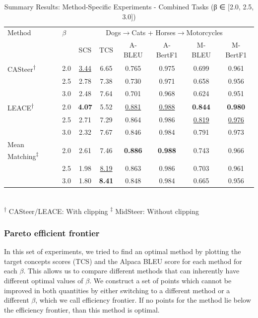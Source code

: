 \begin{table}[htbp]
\centering
\caption{Summary Results: Method-Specific Experiments - Combined Tasks (β ∈ [2.0, 2.5, 3.0])}
\label{tab:single_experiment_table_method_specific_summary}
\begin{tabular}{l|l|cccccc|}
\hline
Method & $\beta$ & \multicolumn{6}{c|}{Dogs$\rightarrow$Cats + Horses$\rightarrow$Motorcycles} \\
 &  & SCS & TCS & A-BLEU & A-BertF1 & M-BLEU & M-BertF1 \\
\hline
CASteer\textsuperscript{†} & 2.0 & \underline{3.44} & 6.65 & 0.765 & 0.975 & 0.699 & 0.961 \\
 & 2.5 & 2.78 & 7.38 & 0.730 & 0.971 & 0.658 & 0.956 \\
 & 3.0 & 2.48 & 7.64 & 0.701 & 0.968 & 0.624 & 0.951 \\
\hline
LEACE\textsuperscript{†} & 2.0 & \textbf{4.07} & 5.52 & \underline{0.881} & \underline{0.988} & \textbf{0.844} & \textbf{0.980} \\
 & 2.5 & 2.71 & 7.29 & 0.864 & 0.986 & \underline{0.819} & \underline{0.976} \\
 & 3.0 & 2.32 & 7.67 & 0.846 & 0.984 & 0.791 & 0.973 \\
\hline
Mean Matching\textsuperscript{‡} & 2.0 & 2.61 & 7.46 & \textbf{0.886} & \textbf{0.988} & 0.743 & 0.966 \\
 & 2.5 & 1.98 & \underline{8.19} & 0.863 & 0.986 & 0.703 & 0.961 \\
 & 3.0 & 1.80 & \textbf{8.41} & 0.848 & 0.984 & 0.665 & 0.956 \\
\hline
\end{tabular}
\\[0.5em]
\footnotesize
\textsuperscript{†} CASteer/LEACE: With clipping \quad \textsuperscript{‡} MidSteer: Without clipping
\end{table}

\subsubsection{Pareto efficient frontier}

In this set of experiments, we tried to find an optimal method by plotting the target concepts scores (TCS) and the Alpaca BLEU score for each method for each $\beta$. This allows us to compare different methods that can inherently have different optimal values of $\beta$. We construct a set of points which cannot be improved in both quantities by either switching to a different method or a different $\beta$, which we call efficiency frontier. If no points for the method lie below the efficiency frontier, than this method is optimal.

